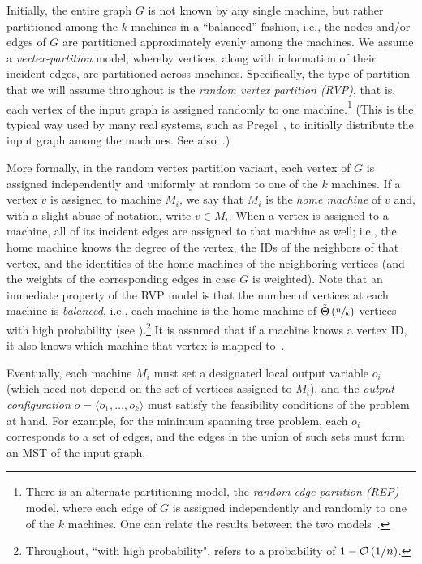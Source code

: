 Initially, the entire graph $G$ is not known by any single machine, but rather
partitioned among the $k$ machines in a ``balanced'' fashion, i.e., the nodes
and/or edges of $G$ are partitioned approximately evenly among the machines.
We assume a \emph{vertex-partition} model, whereby vertices, along with
information of their incident edges, are partitioned across machines.
Specifically, the type of partition that we will assume throughout is the
\emph{random vertex partition (RVP)}, that is, each vertex of the input graph is
assigned randomly to one machine.\footnote{There is an alternate partitioning
model, the \emph{random edge partition (REP)} model, where each edge of $G$ is
assigned independently and randomly to one of the $k$ machines. One can relate
the results between the two models~\cite{KlauckNPR15}.} (This is the typical way
used by many real systems, such as Pregel~\cite{pregel}, to initially distribute
the input graph among the machines. See also~\cite{Stanton14,ChingEKLM15}.)


More formally, in the random vertex partition variant, each vertex of $G$ is
assigned independently and uniformly at random to one of the $k$ machines. If a
vertex $v$ is assigned to machine $M_i$, we say that $M_i$ is the \emph{home
machine} of $v$ and, with a slight abuse of notation, write $v \in M_i$. When a
vertex is assigned to a machine, all of its incident edges are assigned to that
machine as well; i.e., the home machine knows the degree of the vertex, the IDs
of the neighbors of that vertex, and the identities of the home machines of the
neighboring vertices (and the weights of the corresponding edges in case $G$ is
weighted). Note that an immediate property of the RVP model is that the number
of vertices at each machine is \emph{balanced}, i.e., each machine is the home
machine of $\tilde{\Theta}\left(\sfrac{n}{k}\right)$ vertices with high probability (see ).\footnote{Throughout, ``with high
probability", refers to a probability of \(1 - \mathcal{O}\left(1/n\right)\).} It is assumed that
if a machine knows a vertex ID, it also knows which machine that vertex is
mapped to~\cite{KlauckNPR15}.

Eventually, each machine $M_i$ must set a designated local output variable $o_i$
(which need not depend on the set of vertices assigned to $M_i$), and the
\emph{output configuration} $o=\langle o_1,\dots,o_k\rangle$ must satisfy the
feasibility conditions of the problem at hand. For example, for the minimum
spanning tree problem, each $o_i$ corresponds to a set of edges, and the edges
in the union of such sets must form an MST of the input graph.


